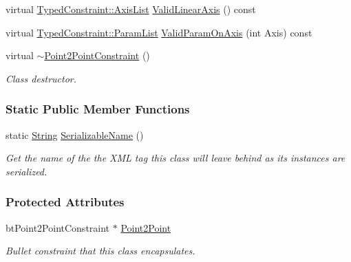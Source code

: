 \begin{DoxyCompactItemize}
virtual \hyperlink{classphys_1_1TypedConstraint_a26261a4055e84e104c58d84eea5667c2}{TypedConstraint::AxisList} \hyperlink{classphys_1_1Point2PointConstraint_a7c430ecbfc798d26ddabd66ee66f6a27}{ValidLinearAxis} () const 
\item 
virtual \hyperlink{classphys_1_1TypedConstraint_a4c2dcea3fbb764e454840329126d034e}{TypedConstraint::ParamList} \hyperlink{classphys_1_1Point2PointConstraint_a5ab3a1dac5cabe07f6abfe576090634f}{ValidParamOnAxis} (int Axis) const 
\item 
virtual \hyperlink{classphys_1_1Point2PointConstraint_a6e0bdac8c6ee7612c07b441c7556dc14}{$\sim$Point2PointConstraint} ()
\begin{DoxyCompactList}\small\item\em Class destructor. \item\end{DoxyCompactList}\end{DoxyCompactItemize}
\subsubsection*{Static Public Member Functions}
\begin{DoxyCompactItemize}
\item 
static \hyperlink{namespacephys_aa03900411993de7fbfec4789bc1d392e}{String} \hyperlink{classphys_1_1Point2PointConstraint_adb43f9fc1ac3ade862f23ecff3dedf27}{SerializableName} ()
\begin{DoxyCompactList}\small\item\em Get the name of the the XML tag this class will leave behind as its instances are serialized. \item\end{DoxyCompactList}\end{DoxyCompactItemize}
\subsubsection*{Protected Attributes}
\begin{DoxyCompactItemize}
\item 
\hypertarget{classphys_1_1Point2PointConstraint_aa58b7fd9fe368c72d5bc5e1990bdf593}{
btPoint2PointConstraint $\ast$ \hyperlink{classphys_1_1Point2PointConstraint_aa58b7fd9fe368c72d5bc5e1990bdf593}{Point2Point}}
\label{classphys_1_1Point2PointConstraint_aa58b7fd9fe368c72d5bc5e1990bdf593}

\begin{DoxyCompactList}\small\item\em Bullet constraint that this class encapsulates. \item\end{DoxyCompactList}\end{DoxyCompactItemize}


